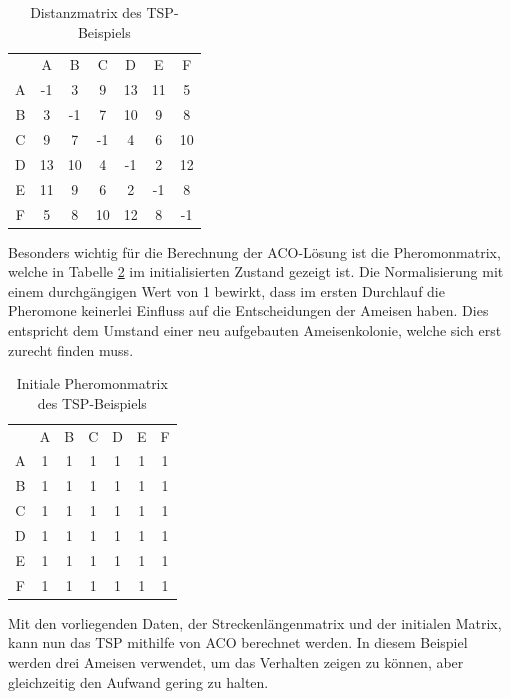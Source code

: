 	\begin{table}
		\centering
		\footnotesize
		\begin{tabular}{c c c c c c c}
			  & A & B & C & D & E & F \\
			A & -1 & 3 & 9 & 13 & 11 & 5\\ 
			B & 3 & -1 & 7 & 10 & 9 & 8\\ 
			C & 9 & 7 & -1 & 4 & 6 & 10\\
			D & 13 & 10 & 4 & -1 & 2 & 12\\
			E & 11 & 9 & 6 & 2 & -1 & 8\\
			F & 5 & 8 & 10 & 12 & 8 & -1\\
		\end{tabular}
		\caption{Distanzmatrix des \ac{TSP}-Beispiels}
		\label{tspAcoNumerisch_matrix}
	\end{table}

	Besonders wichtig für die Berechnung der \ac{ACO}-Lösung ist die Pheromonmatrix, welche in Tabelle \ref{tspAcoNumerisch_pheromon_initial} im initialisierten Zustand gezeigt ist. Die Normalisierung mit einem durchgängigen Wert von 1 bewirkt, dass im ersten Durchlauf die Pheromone keinerlei Einfluss auf die Entscheidungen der Ameisen haben. Dies entspricht dem Umstand einer neu aufgebauten Ameisenkolonie, welche sich erst zurecht finden muss.
	
	\begin{table}
		\centering
		\footnotesize
		\begin{tabular}{c c c c c c c}
			& A & B & C & D & E & F \\
			A & 1 & 1 & 1 & 1 & 1 & 1\\ 
			B & 1 & 1 & 1 & 1 & 1 & 1\\ 
			C & 1 & 1 & 1 & 1 & 1 & 1\\
			D & 1 & 1 & 1 & 1 & 1 & 1\\
			E & 1 & 1 & 1 & 1 & 1 & 1\\
			F & 1 & 1 & 1 & 1 & 1 & 1\\
		\end{tabular}
		\caption{Initiale Pheromonmatrix des \ac{TSP}-Beispiels}
		\label{tspAcoNumerisch_pheromon_initial}
	\end{table}

	Mit den vorliegenden Daten, der Streckenlängenmatrix und der initialen Matrix, kann nun das \ac{TSP} mithilfe von \ac{ACO} berechnet werden. In diesem Beispiel werden drei Ameisen verwendet, um das Verhalten zeigen zu können, aber gleichzeitig den Aufwand gering zu halten.
	
